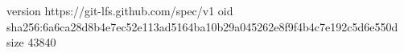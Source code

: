 version https://git-lfs.github.com/spec/v1
oid sha256:6a6ca28d8b4e7ec52e113ad5164ba10b29a045262e8f9f4b4c7e192c5d6e550d
size 43840
